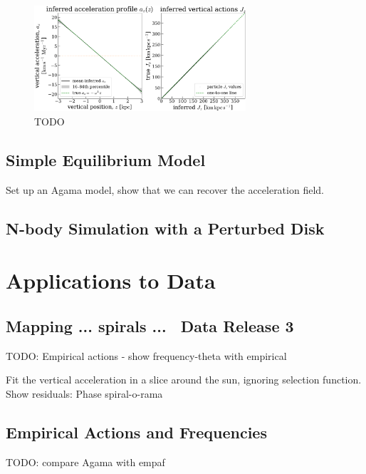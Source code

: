 \begin{figure}[t!]
\begin{center}
\includegraphics[width=0.7\textwidth]{sho-validation.pdf}
\end{center}
\caption{%
TODO
\label{fig:sho-validation}
}
\end{figure}

\subsection{Simple Equilibrium Model}
\label{sec:sim-eq}

Set up an Agama model, show that we can recover the acceleration field.


\subsection{N-body Simulation with a Perturbed Disk}
\label{sec:sim-jason}


\section{Applications to Data} \label{sec:applications-data}

\subsection{Mapping ... spirals ... \gaia\ Data Release 3}
\label{sec:gaiadr3}

TODO: Empirical actions - show frequency-theta with empirical

Fit the vertical acceleration in a slice around the sun, ignoring selection function.
Show residuals: Phase spiral-o-rama


\subsection{Empirical Actions and Frequencies}
\label{sec:gaiadr3}

TODO: compare Agama with empaf



